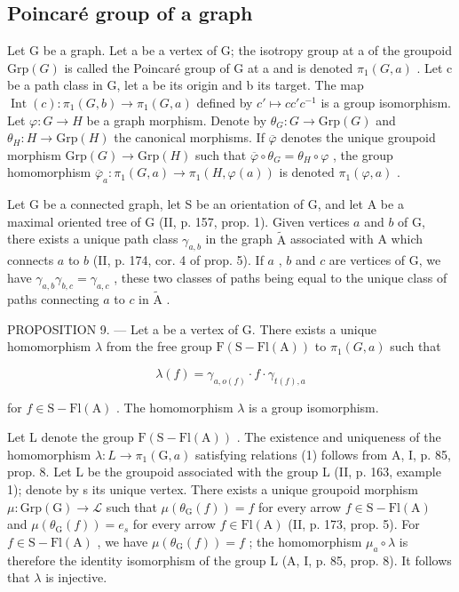 \subsection{Poincaré group of a graph}

Let G be a graph. Let a be a vertex of G; the isotropy group at a of the groupoid \(\mathrm{Grp}(G)\) is called the Poincaré group of G at a and is denoted \(\pi_{1}(G,a)\) . Let c be a path class in G, let a be its origin and b its target. The map \(\operatorname{Int}(c): \pi_{1}(G,b)\to\pi_{1}(G,a)\) defined by \(c'\mapsto cc'c^{-1}\) is a group isomorphism. Let \(\varphi:G\to H\) be a graph morphism. Denote by \(\theta_{G}:G\to\mathrm{Grp}(G)\) and \(\theta_{H}:H\to\mathrm{Grp}(H)\) the canonical morphisms. If \(\overline{\varphi}\) denotes the unique groupoid morphism \(\mathrm{Grp}(G) \to \mathrm{Grp}(H)\) such that \(\overline{\varphi}\circ\theta_{G}=\theta_{H}\circ\varphi\) , the group homomorphism \(\overline{\varphi}_{a}:\pi_{1}(G,a)\to\pi_{1}(H,\varphi(a))\) is denoted \(\pi_{1}(\varphi,a)\) .

Let G be a connected graph, let S be an orientation of G, and let A be a maximal oriented tree of G (II, p. 157, prop. 1). Given vertices \(a\) and \(b\) of G, there exists a unique path class \(\gamma_{a,b}\) in the graph \(\widetilde{\mathrm{A}}\) associated with A which connects \(a\) to \(b\) (II, p. 174, cor. 4 of prop. 5). If \(a\) , \(b\) and \(c\) are vertices of G, we have \(\gamma_{a,b}\gamma_{b,c} = \gamma_{a,c}\) , these two classes of paths being equal to the unique class of paths connecting \(a\) to \(c\) in \(\widetilde{\mathrm{A}}\) .

PROPOSITION 9. --- Let a be a vertex of G. There exists a unique homomorphism \(\lambda\) from the free group \(\mathrm{F}(\mathrm{S}-\mathrm{Fl}(\mathrm{A}))\) to \(\pi_1(G, a)\) such that

\[
\lambda (f) = \gamma_ {a, o (f)} \cdot f \cdot \gamma_ {t (f), a}\tag{1}
\]

for \(f \in \mathrm{S} - \mathrm{Fl}(\mathrm{A})\) . The homomorphism \(\lambda\) is a group isomorphism.

Let L denote the group \(\mathrm{F}(\mathrm{S}-\mathrm{Fl}(\mathrm{A}))\) . The existence and uniqueness of the homomorphism \(\lambda\colon L\to\pi_{1}(\mathrm{G},a)\) satisfying relations (1) follows from A, I, p. 85, prop. 8. Let L be the groupoid associated with the group L (II, p. 163, example 1); denote by s its unique vertex. There exists a unique groupoid morphism \(\mu\colon\mathrm{Grp}(\mathrm{G})\to\mathcal{L}\) such that \(\mu(\theta_{\mathrm{G}}(f))=f\) for every arrow \(f\in\mathrm{S}-\mathrm{Fl}(\mathrm{A})\) and \(\mu(\theta_{\mathrm{G}}(f))=e_{s}\) for every arrow \(f\in\mathrm{Fl}(\mathrm{A})\) (II, p. 173, prop. 5). For \(f\in\mathrm{S}-\mathrm{Fl}(\mathrm{A})\) , we have \(\mu(\theta_{\mathrm{G}}(f))=f\) ; the homomorphism \(\mu_{a}\circ\lambda\) is therefore the identity isomorphism of the group L (A, I, p. 85, prop. 8). It follows that \(\lambda\) is injective.

